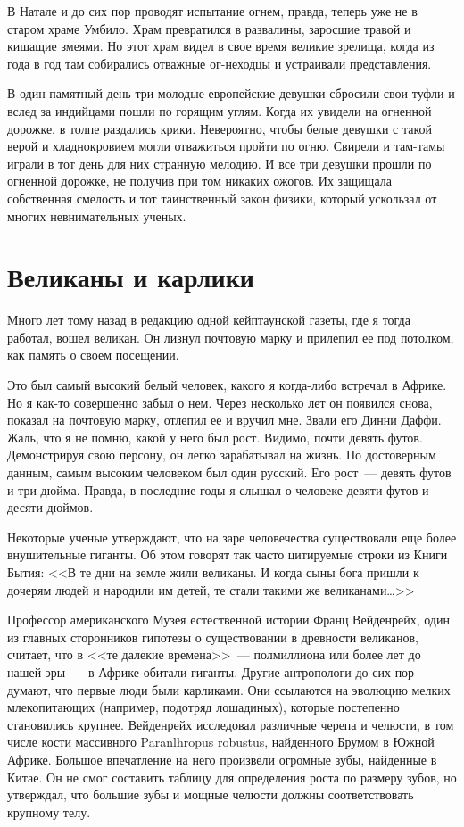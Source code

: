 \documentclass[12pt,a4paper,twoside,openany,svgnames]{memoir}
\begin{document}
В Натале и до сих пор проводят испытание огнем, правда, теперь уже не в старом храме Умбило. Храм превратился в развалины, заросшие травой и кишащие змеями. Но этот храм видел в свое время великие зрелища, когда из года в год там собирались отважные ог-неходцы и устраивали представления.

В один памятный день три молодые европейские девушки сбросили свои туфли и вслед за индийцами пошли по горящим углям. Когда их увидели на огненной дорожке, в толпе раздались крики. Невероятно, чтобы белые девушки с такой верой и хладнокровием могли отважиться пройти по огню. Свирели и там-тамы играли в тот день для них странную мелодию. И все три девушки прошли по огненной дорожке, не получив при том никаких ожогов. Их защищала собственная смелость и тот таинственный закон физики, который ускользал от многих невнимательных ученых.

\chapter{Великаны и карлики}

Много лет тому назад в редакцию одной кейптаунской газеты, где я тогда работал, вошел великан. Он лизнул почтовую марку и прилепил ее под потолком, как память о своем посещении.

Это был самый высокий белый человек, какого я когда-либо встречал в Африке. Но я как-то совершенно забыл о нем. Через несколько лет он появился снова, показал на почтовую марку, отлепил ее и вручил мне. Звали его Динни Даффи. Жаль, что я не помню, какой у него был рост. Видимо, почти девять футов. Демонстрируя свою персону, он легко зарабатывал на жизнь. По достоверным данным, самым высоким человеком был один русский. Его рост~--- девять футов и три дюйма. Правда, в последние годы я слышал о человеке девяти футов и десяти дюймов.

Некоторые ученые утверждают, что на заре человечества существовали еще более внушительные гиганты. Об этом говорят так часто цитируемые строки из Книги Бытия: <<В те дни на земле жили великаны. И когда сыны бога пришли к дочерям людей и народили им детей, те стали такими же великанами\ldots>>

Профессор американского Музея естественной истории Франц Вейденрейх, один из главных сторонников гипотезы о существовании в древности великанов, считает, что в <<те далекие времена>>~--- полмиллиона или более лет до нашей эры~--- в Африке обитали гиганты. Другие антропологи до сих пор думают, что первые люди были карликами. Они ссылаются на эволюцию мелких млекопитающих (например, подотряд лошадиных), которые постепенно становились крупнее. Вейденрейх исследовал различные черепа и челюсти, в том числе кости массивного Paranlhropus robustus, найденного Брумом в Южной Африке. Большое впечатление на него произвели огромные зубы, найденные в Китае. Он не смог составить таблицу для определения роста по размеру зубов, но утверждал, что большие зубы и мощные челюсти должны соответствовать крупному телу.
\end{document}
